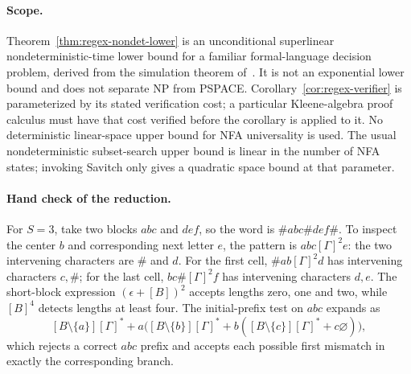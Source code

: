 \documentclass[11pt]{article}
\theoremstyle{definition}
\theoremstyle{remark}
\begin{document}
\paragraph{Scope.}
Theorem~\ref{thm:regex-nondet-lower} is an unconditional superlinear
nondeterministic-time lower bound for a familiar formal-language
decision problem, derived from the simulation theorem of~\cite{Cruz26}.
It is not an exponential lower bound and does not separate NP from
PSPACE. Corollary~\ref{cor:regex-verifier} is parameterized by
its stated verification cost; a particular Kleene-algebra proof calculus
must have that cost verified before the corollary is applied to it.
No deterministic linear-space upper bound for NFA universality is used.
The usual nondeterministic subset-search upper bound is linear in the
number of NFA states; invoking Savitch only gives a quadratic
space bound at that parameter.

\paragraph{Hand check of the reduction.}
For $S=3$, take two blocks $abc$ and $def$, so the word is
$\#abc\#def\#$. To inspect the center $b$ and corresponding next
letter $e$, the pattern is $abc[\Gamma]^2e$: the two intervening
characters are $\#$ and $d$. For the first cell, $\#ab[\Gamma]^2d$
has intervening characters $c,\#$; for the last cell,
$bc\#[\Gamma]^2f$ has intervening characters $d,e$.
The short-block expression $(\epsilon+[B])^2$ accepts lengths
zero, one and two, while $[B]^4$ detects lengths at least four.
The initial-prefix test on $abc$ expands as
\[
 [B\setminus\{a\}][\Gamma]^*
 +a\bigl([B\setminus\{b\}][\Gamma]^*
          +b([B\setminus\{c\}][\Gamma]^*+c\varnothing)\bigr),
\]
which rejects a correct $abc$ prefix and accepts each possible first
mismatch in exactly the corresponding branch.
\end{document}
